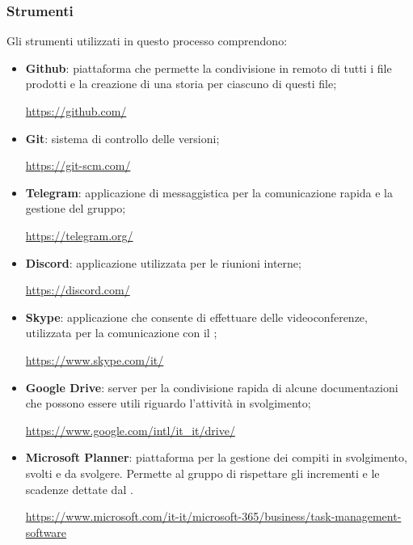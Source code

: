 \subsubsection{Strumenti}
Gli strumenti utilizzati in questo processo comprendono:
\begin{itemize}
	\item \textbf{Github}: piattaforma che permette la condivisione in remoto di tutti i file prodotti e la creazione di una storia per ciascuno di questi file;
	\begin{center}
		\textcolor{blue}{\url{https://github.com/}}
	\end{center}
	\item \textbf{Git}: sistema di controllo delle versioni;
	\begin{center}
		\textcolor{blue}{\url{https://git-scm.com/}}
	\end{center}
	\item \textbf{Telegram}: applicazione di messaggistica per la comunicazione rapida e la gestione del gruppo;
	\begin{center}
		\textcolor{blue}{\url{https://telegram.org/}}
	\end{center}
	\item \textbf{Discord}: applicazione  utilizzata per le riunioni interne;
	\begin{center}
		\textcolor{blue}{\url{https://discord.com/}}
	\end{center}
	\item \textbf{Skype}: applicazione che consente di effettuare delle videoconferenze, utilizzata per la comunicazione con il ;
	\begin{center}
		\textcolor{blue}{\url{https://www.skype.com/it/}}
	\end{center}
	\item \textbf{Google Drive}: server per la condivisione rapida di alcune documentazioni che possono essere utili riguardo l'attività in svolgimento;
	\begin{center}
		\textcolor{blue}{\url{https://www.google.com/intl/it_it/drive/}}
	\end{center}
	\item \textbf{Microsoft Planner}: piattaforma per la gestione dei compiti in svolgimento, svolti e da svolgere. Permette al gruppo di rispettare gli incrementi e le scadenze dettate dal \PdP.
	\begin{center}
		\textcolor{blue}{\url{https://www.microsoft.com/it-it/microsoft-365/business/task-management-software}}
	\end{center}
\end{itemize}